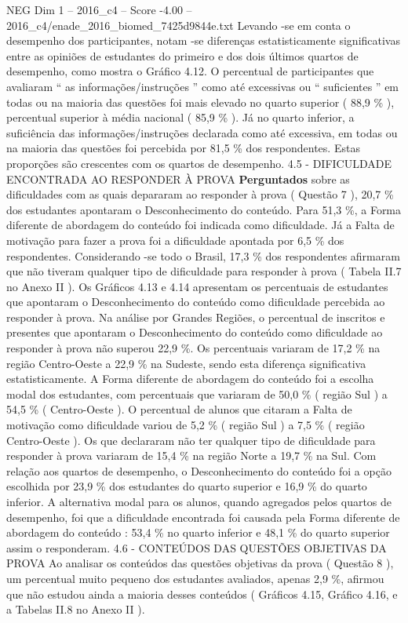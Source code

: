 \begin{textsample}{NEG Dim 1 – 2016\_c4 – Score -4.00 – 2016\_c4/enade\_2016\_biomed\_7425d9844e.txt}
Levando -se em conta o desempenho dos participantes, notam -se diferenças estatisticamente significativas entre as opiniões de estudantes do primeiro e dos dois últimos quartos de desempenho, como mostra o Gráfico 4.12.
O percentual de participantes que avaliaram “ as informações/instruções ” como até excessivas ou “ suficientes ” em todas ou na maioria das questões foi mais elevado no quarto superior ( 88,9 \% ), percentual superior à média nacional ( 85,9 \% ).
Já no quarto inferior, a suficiência das informações/instruções declarada como até excessiva, em todas ou na maioria das questões foi percebida por 81,5 \% dos respondentes.
Estas proporções são crescentes com os quartos de desempenho. 4.5 - DIFICULDADE ENCONTRADA AO RESPONDER À PROVA \textbf{Perguntados} sobre as dificuldades com as quais depararam ao responder à prova ( Questão 7 ), 20,7 \% dos estudantes apontaram o Desconhecimento do conteúdo.
Para 51,3 \%, a Forma diferente de abordagem do conteúdo foi indicada como dificuldade.
Já a Falta de motivação para fazer a prova foi a dificuldade apontada por 6,5 \% dos respondentes.
Considerando -se todo o Brasil, 17,3 \% dos respondentes afirmaram que não tiveram qualquer tipo de dificuldade para responder à prova ( Tabela II.7 no Anexo II ).
Os Gráficos 4.13 e 4.14 apresentam os percentuais de estudantes que apontaram o Desconhecimento do conteúdo como dificuldade percebida ao responder à prova.
Na análise por Grandes Regiões, o percentual de inscritos e presentes que apontaram o Desconhecimento do conteúdo como dificuldade ao responder à prova não superou 22,9 \%.
Os percentuais variaram de 17,2 \% na região Centro-Oeste a 22,9 \% na Sudeste, sendo esta diferença significativa estatisticamente.
A Forma diferente de abordagem do conteúdo foi a escolha modal dos estudantes, com percentuais que variaram de 50,0 \% ( região Sul ) a 54,5 \% ( Centro-Oeste ).
O percentual de alunos que citaram a Falta de motivação como dificuldade variou de 5,2 \% ( região Sul ) a 7,5 \% ( região Centro-Oeste ).
Os que declararam não ter qualquer tipo de dificuldade para responder à prova variaram de 15,4 \% na região Norte a 19,7 \% na Sul.
Com relação aos quartos de desempenho, o Desconhecimento do conteúdo foi a opção escolhida por 23,9 \% dos estudantes do quarto superior e 16,9 \% do quarto inferior.
A alternativa modal para os alunos, quando agregados pelos quartos de desempenho, foi que a dificuldade encontrada foi causada pela Forma diferente de abordagem do conteúdo : 53,4 \% no quarto inferior e 48,1 \% do quarto superior assim o responderam. 4.6 - CONTEÚDOS DAS QUESTÕES OBJETIVAS DA PROVA Ao analisar os conteúdos das questões objetivas da prova ( Questão 8 ), um percentual muito pequeno dos estudantes avaliados, apenas 2,9 \%, afirmou que não estudou ainda a maioria desses conteúdos ( Gráficos 4.15, Gráfico 4.16, e a Tabelas II.8 no Anexo II ).

\end{textsample}
